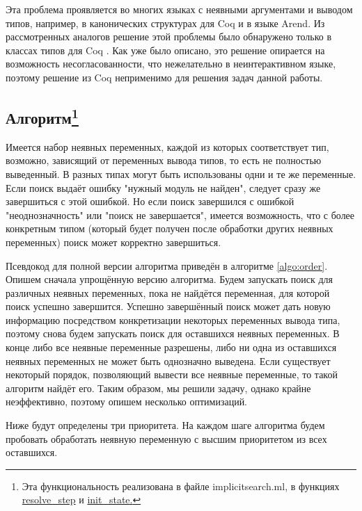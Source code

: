 \documentclass[../diploma.tex]{subfiles}
\begin{document}
Эта проблема проявляется во многих языках с неявными аргументами и выводом типов, например, в канонических структурах для Coq и в языке Arend. Из рассмотренных аналогов решение этой проблемы было обнаружено только в классах типов для Coq \cite{coq_typeclasses}. Как уже было описано, это решение опирается на возможность несогласованности, что нежелательно в неинтерактивном языке, поэтому решение из Coq неприменимо для решения задач данной работы.

\subsection{Алгоритм\footnote{Эта функциональность реализована в файле implicitsearch.ml, в функциях \href{https://github.com/trilis/1ml/blob/5b850e875e9ae06d3ce8e90a22cedbabcf0f33ca/implicitsearch.ml\#L191}{resolve\_step} и \href{https://github.com/trilis/1ml/blob/5b850e875e9ae06d3ce8e90a22cedbabcf0f33ca/implicitsearch.ml\#L227}{init\_state.}}}

Имеется набор неявных переменных, каждой из которых соответствует тип, возможно, зависящий от переменных вывода типов, то есть не полностью выведенный. В разных типах могут быть использованы одни и те же переменные. Если поиск выдаёт ошибку "нужный модуль не найден", следует сразу же завершиться с этой ошибкой. Но если поиск завершился с ошибкой "неоднозначность" или "поиск не завершается", имеется возможность, что с более конкретным типом (который будет получен после обработки других неявных переменных) поиск может корректно завершиться.  

Псевдокод для полной версии алгоритма приведён в алгоритме \ref{algo:order}. Опишем сначала упрощённую версию алгоритма. Будем запускать поиск для различных неявных переменных, пока не найдётся переменная, для которой поиск успешно завершится. Успешно завершённый поиск может дать новую информацию посредством конкретизации некоторых переменных вывода типа, поэтому снова будем запускать поиск для оставшихся неявных переменных. В конце либо все неявные переменные разрешены, либо ни одна из оставшихся неявных переменных не может быть однозначно выведена. Если существует некоторый порядок, позволяющий вывести все неявные переменные, то такой алгоритм найдёт его. Таким образом, мы решили задачу, однако крайне неэффективно, поэтому опишем несколько оптимизаций.

Ниже будут определены три приоритета. На каждом шаге алгоритма будем пробовать обработать неявную переменную с высшим приоритетом из всех оставшихся.
\end{document}
